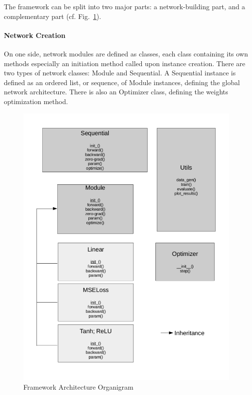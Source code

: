 \documentclass[11pt, a4paper]{article}
\begin{document}
The framework can be split into two major parts: a network-building part, and a complementary part (cf. Fig.~\ref{fig:arch_org}). 
\paragraph{Network Creation}
On one side, network modules are defined as classes, each class containing its own methods especially an initiation method called upon instance creation. There are two types of network classes: Module and Sequential. A Sequential instance is defined as an ordered list, or sequence, of Module instances, defining the global network architecture. There is also an Optimizer class, defining the weights optimization method. 
\begin{figure}
	\begin{centering}
		\includegraphics[scale=0.4]{architecture_org.png}
		\caption{Framework Architecture Organigram}
		\label{fig:arch_org}
	\end{centering}
\end{figure}
\end{document}
